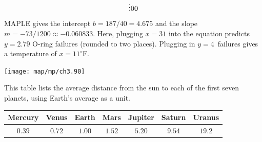 \begin{exercises}
\begin{answer}
\begin{exparts}
\begin{equation*}
{%
                     \vdots \\
                     0 \\
                     0}
          \end{equation*}
          MAPLE gives the intercept $b=187/40=4.675$ and the 
          slope $m=-73/1200\approx -0.060833$.
          Here, plugging $x=31$ into the equation predicts 
          $y=2.79$ O-ring failures (rounded to two places).
          Plugging in $y=4$~failures gives a temperature of 
          $x=11^\circ$F.
     \begin{center}  \small
       \texttt{[image: map/mp/ch3.90]}
      \end{center}
      \end{exparts}  
    \end{answer}
  \item 
     This table lists the average distance from the sun to
     each of the first seven planets, using Earth's average as a unit.
     \begin{center}
       \begin{tabular}{ccccccc}
         Mercury &Venus   &Earth   &Mars    &Jupiter &Saturn  &Uranus  \\ 
         \hline     
         $0.39$  &$0.72$  &$1.00$  &$1.52$  &$5.20$  &$9.54$  &$19.2$
       \end{tabular}

\end{center}
\end{exercises}
